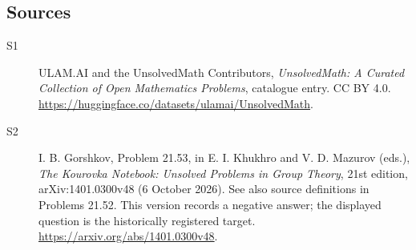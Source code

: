 \documentclass[11pt]{article}
\begin{document}
\subsection{Sources}
\begin{description}
\item[\hypertarget{source:statement:1}{S1}] ULAM.AI and the UnsolvedMath Contributors, \emph{UnsolvedMath: A Curated Collection of Open Mathematics Problems}, catalogue entry. CC BY 4.0. \url{https://huggingface.co/datasets/ulamai/UnsolvedMath}.
\item[\hypertarget{source:statement:2}{S2}] I. B. Gorshkov, Problem 21.53, in E. I. Khukhro and V. D. Mazurov (eds.), \emph{The Kourovka Notebook: Unsolved Problems in Group Theory}, 21st edition, arXiv:1401.0300v48 (6 October 2026). See also source definitions in Problems 21.52. This version records a negative answer; the displayed question is the historically registered target. \url{https://arxiv.org/abs/1401.0300v48}.
\end{description}
\label{end:statement}
\end{document}
